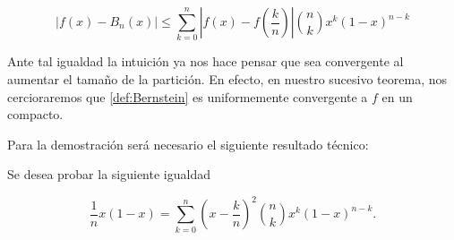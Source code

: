 \begin{equation} \label{eq:eq:Bernstein_diferencia}
    |f(x)-B_n(x)| \leq \sum_{k=0}^n \left|f(x) - f \left( \frac{k}{n} \right)\right|
    \binom{n}{k} x^{k} (1-x)^{n-k}
\end{equation} 

Ante tal igualdad la intuición ya nos
hace pensar que sea convergente al aumentar el tamaño de la partición.
 En efecto, en nuestro sucesivo teorema, nos cercioraremos que \ref{def:Bernstein}
 es uniformemente convergente a $f$ en un compacto. 

Para la demostración será necesario el siguiente resultado técnico: 
\begin{lema}
    Se desea probar la siguiente igualdad 

    \begin{equation} \label{eq:binomio_segunda_suma}
        \frac{1}{n} x (1-x)= \sum_{k=0}^{n}  \left( x-\frac{k}{n} \right)^2  \binom{n}{k} x^{k} (1-x)^{n-k}.
     \end{equation}
\end{lema}
